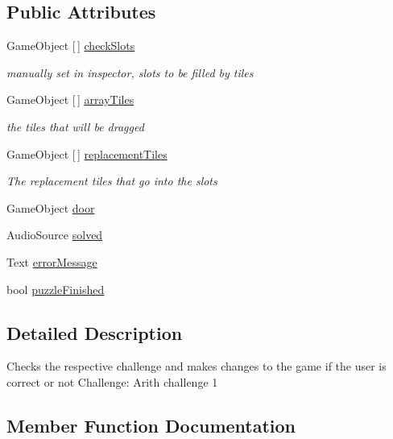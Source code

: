 \subsection*{Public Attributes}
\begin{DoxyCompactItemize}
\item 
Game\+Object \mbox{[}$\,$\mbox{]} \hyperlink{class_data_type_completion_check_ace0376e59ce94a6d019a51a160acdfad}{check\+Slots}
\begin{DoxyCompactList}\small\item\em manually set in inspector, slots to be filled by tiles \end{DoxyCompactList}\item 
Game\+Object \mbox{[}$\,$\mbox{]} \hyperlink{class_data_type_completion_check_a0ff49d8fba4310d33f2ba4d73c7a4c5c}{array\+Tiles}
\begin{DoxyCompactList}\small\item\em the tiles that will be dragged \end{DoxyCompactList}\item 
Game\+Object \mbox{[}$\,$\mbox{]} \hyperlink{class_data_type_completion_check_a449d1553d09ac32e51a559a98060a938}{replacement\+Tiles}
\begin{DoxyCompactList}\small\item\em The replacement tiles that go into the slots \end{DoxyCompactList}\item 
Game\+Object \hyperlink{class_data_type_completion_check_a30fb1fb9074db5c7585e72a1ea4f85d7}{door}
\item 
Audio\+Source \hyperlink{class_data_type_completion_check_ab5a51018023ce893836ccfabf1c73f60}{solved}
\item 
Text \hyperlink{class_data_type_completion_check_ae9a30b339b4e198795dfe7bc2bf57c11}{error\+Message}
\item 
bool \hyperlink{class_data_type_completion_check_a888ca57a6f64ac6e4eefa302a8067986}{puzzle\+Finished}
\end{DoxyCompactItemize}


\subsection{Detailed Description}
Checks the respective challenge and makes changes to the game if the user is correct or not Challenge\+: Arith challenge 1 

\subsection{Member Function Documentation}
\mbox{\label{class_data_type_completion_check_a508b3241c277e5fa65a9d9510f971946}} 
